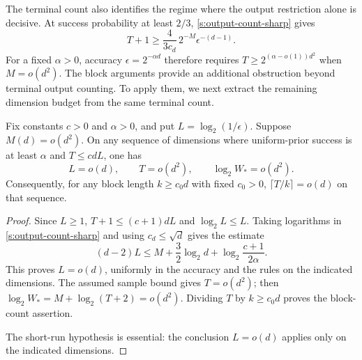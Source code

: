 The terminal count also identifies the regime where the output
restriction alone is decisive. At success probability at least
\(2/3\), \eqref{s:output-count-sharp} gives
\[
 T+1\ge \frac{4}{3c_d}\,2^{-M}\epsilon^{-(d-1)}.
\]
For a fixed \(\alpha>0\), accuracy \(\epsilon=2^{-\alpha d}\)
therefore requires \(T\ge2^{(\alpha-o(1))d^2}\) when
\(M=o(d^2)\). The block arguments provide an additional obstruction beyond terminal
output counting. To apply them, we next extract the
remaining dimension budget from the same terminal count.

\begin{lemma}\label{s:short-run}
Fix constants \(c>0\) and \(\alpha>0\), and put
\(L=\log_2(1/\epsilon)\). Suppose \(M(d)=o(d^2)\). On any sequence
of dimensions where uniform-prior success is at least \(\alpha\)
and \(T\le cdL\), one has
\begin{equation}\label{s:short-run-conclusions}
 L=o(d),\qquad T=o(d^2),\qquad \log_2 W_*=o(d^2).
\end{equation}
Consequently, for any block length \(k\ge c_0d\) with fixed \(c_0>0\),
\(\lceil T/k\rceil=o(d)\) on that sequence.
\end{lemma}
\begin{proof}
Since \(L\ge1\), \(T+1\le(c+1)dL\) and
\(\log_2 L\le L\). Taking logarithms in
\eqref{s:output-count-sharp} and using \(c_d\le\sqrt d\) gives the
estimate
\begin{equation}\label{s:sharp-short-run}
 (d-2)L
 \le M+\frac32\log_2d+\log_2\frac{c+1}{2\alpha}.
\end{equation}
This proves \(L=o(d)\), uniformly in the accuracy and the rules on
the indicated dimensions. The assumed sample bound gives
\(T=o(d^2)\); then \(\log_2 W_*=M+\log_2(T+2)=o(d^2)\).
Dividing \(T\) by \(k\ge c_0d\) proves the block-count assertion.

The short-run hypothesis is essential: the conclusion
\(L=o(d)\) applies only on the indicated dimensions.
\end{proof}

